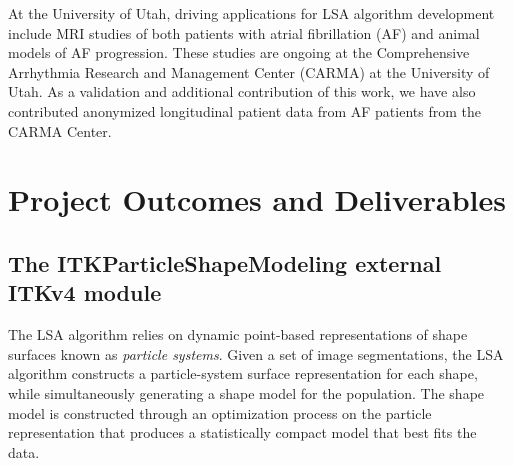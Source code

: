 \documentclass[11pt]{article}
\begin{document}
At the University of Utah, driving applications for LSA algorithm
development include MRI studies of both patients with atrial
fibrillation (AF) and animal models of AF progression.  These studies
are ongoing at the Comprehensive Arrhythmia Research and Management
Center (CARMA) at the University of Utah.  As a validation and
additional contribution of this work, we have also contributed
anonymized longitudinal patient data from AF patients from the CARMA
Center.



\section{Project Outcomes and Deliverables}
\subsection{The ITKParticleShapeModeling external ITKv4 module}
The LSA algorithm relies on dynamic point-based representations of
shape surfaces known as {\em particle systems}.  Given a set of image
segmentations, the LSA algorithm constructs a particle-system surface
representation for each shape, while simultaneously generating a shape
model for the population.  The shape model is constructed through an
optimization process on the particle representation that produces a
statistically compact model that best fits the data.
\end{document}
